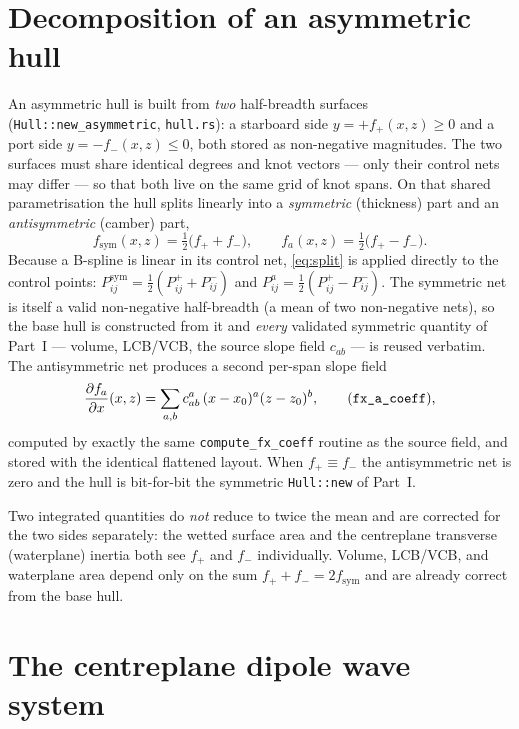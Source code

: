 \documentclass[11pt]{article}
\begin{document}
\section{Decomposition of an asymmetric hull}
\label{sec:decomp}

An asymmetric hull is built from \emph{two} half-breadth surfaces
(\texttt{Hull::new\_asymmetric}, \texttt{hull.rs}): a starboard side
$y = +f_+(x,z)\ge 0$ and a port side $y = -f_-(x,z)\le 0$, both stored as
non-negative magnitudes. The two surfaces must share identical degrees and knot
vectors --- only their control nets may differ --- so that both live on the same
grid of knot spans. On that shared parametrisation the hull splits linearly into
a \emph{symmetric} (thickness) part and an \emph{antisymmetric} (camber) part,
\begin{equation}
  f_{\mathrm{sym}}(x,z) = \tfrac12\bigl(f_+ + f_-\bigr),
  \qquad
  f_a(x,z) = \tfrac12\bigl(f_+ - f_-\bigr).
  \label{eq:split}
\end{equation}
Because a B-spline is linear in its control net, \eqref{eq:split} is applied
directly to the control points: $P^{\mathrm{sym}}_{ij} = \tfrac12(P^{+}_{ij} +
P^{-}_{ij})$ and $P^{a}_{ij} = \tfrac12(P^{+}_{ij} - P^{-}_{ij})$. The symmetric
net is itself a valid non-negative half-breadth (a mean of two non-negative
nets), so the base hull is constructed from it and \emph{every} validated
symmetric quantity of Part~I --- volume, LCB/VCB, the source slope field
$c_{ab}$ --- is reused verbatim. The antisymmetric net produces a second
per-span slope field
\begin{equation}
  \frac{\partial f_a}{\partial x}(x,z)
    = \sum_{a,b} c^{a}_{ab}\,(x-x_0)^a (z-z_0)^b,
  \qquad
  \text{(\texttt{fx\_a\_coeff}),}
  \label{eq:fxa}
\end{equation}
computed by exactly the same \texttt{compute\_fx\_coeff} routine as the source
field, and stored with the identical flattened layout. When $f_+ \equiv f_-$ the
antisymmetric net is zero and the hull is bit-for-bit the symmetric
\texttt{Hull::new} of Part~I.

Two integrated quantities do \emph{not} reduce to twice the mean and are
corrected for the two sides separately: the wetted surface area and the
centreplane transverse (waterplane) inertia both see $f_+$ and $f_-$
individually. Volume, LCB/VCB, and waterplane area depend only on the sum
$f_+ + f_- = 2 f_{\mathrm{sym}}$ and are already correct from the base hull.

\section{The centreplane dipole wave system}
\label{sec:dipole}
\end{document}
